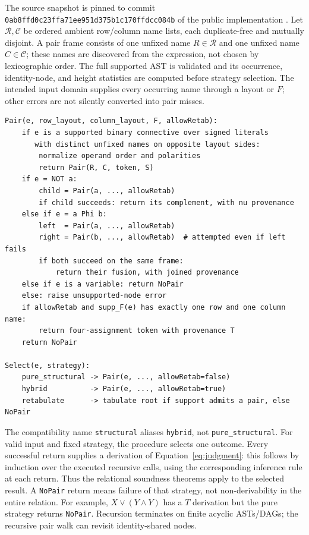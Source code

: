 \documentclass[10pt]{article}
\theoremstyle{plain}
\theoremstyle{definition}
\theoremstyle{remark}
\begin{document}
The source snapshot is pinned to commit \texttt{0ab8ffd0c23ffa71ee951d375b1c170ffdcc084b} of the public implementation \cite{CompilerSnapshot2026}. Let $\mathcal R,\mathcal C$ be ordered ambient row/column name lists, each duplicate-free and mutually disjoint. A pair frame consists of one unfixed name $R\in\mathcal R$ and one unfixed name $C\in\mathcal C$; these names are discovered from the expression, not chosen by lexicographic order. The full supported AST is validated and its occurrence, identity-node, and height statistics are computed before strategy selection. The intended input domain supplies every occurring name through a layout or $F$; other errors are not silently converted into pair misses.

\begin{lstlisting}
Pair(e, row_layout, column_layout, F, allowRetab):
    if e is a supported binary connective over signed literals
       with distinct unfixed names on opposite layout sides:
        normalize operand order and polarities
        return Pair(R, C, token, S)
    if e = NOT a:
        child = Pair(a, ..., allowRetab)
        if child succeeds: return its complement, with nu provenance
    else if e = a Phi b:
        left  = Pair(a, ..., allowRetab)
        right = Pair(b, ..., allowRetab)  # attempted even if left fails
        if both succeed on the same frame:
            return their fusion, with joined provenance
    else if e is a variable: return NoPair
    else: raise unsupported-node error
    if allowRetab and supp_F(e) has exactly one row and one column name:
        return four-assignment token with provenance T
    return NoPair

Select(e, strategy):
    pure_structural -> Pair(e, ..., allowRetab=false)
    hybrid          -> Pair(e, ..., allowRetab=true)
    retabulate      -> tabulate root if support admits a pair, else NoPair
\end{lstlisting}

The compatibility name \texttt{structural} aliases \texttt{hybrid}, not \texttt{pure\_structural}. For valid input and fixed strategy, the procedure selects one outcome. Every successful return supplies a derivation of Equation~\eqref{eq:judgment}: this follows by induction over the executed recursive calls, using the corresponding inference rule at each return. Thus the relational soundness theorems apply to the selected result. A \texttt{NoPair} return means failure of that strategy, not non-derivability in the entire relation. For example, $X\lor(Y\land Y)$ has a $T$ derivation but the pure strategy returns \texttt{NoPair}. Recursion terminates on finite acyclic ASTs/DAGs; the recursive pair walk can revisit identity-shared nodes.
\end{document}
